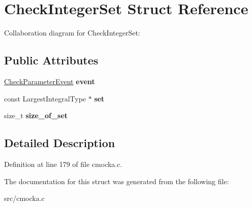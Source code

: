 \hypertarget{structCheckIntegerSet}{}\section{Check\+Integer\+Set Struct Reference}
\label{structCheckIntegerSet}


Collaboration diagram for Check\+Integer\+Set\+:
\subsection*{Public Attributes}
\begin{DoxyCompactItemize}
\item 
\mbox{\label{structCheckIntegerSet_a7153dfb1ec04c0fcacfeb2d60321d4fd}} 
\hyperlink{structCheckParameterEvent}{Check\+Parameter\+Event} {\bfseries event}
\item 
\mbox{\label{structCheckIntegerSet_a9bb5e12093c709bc42788033506c1c2a}} 
const Largest\+Integral\+Type $\ast$ {\bfseries set}
\item 
\mbox{\label{structCheckIntegerSet_a82dbcbeea43de48060c86d89c6ccc444}} 
size\+\_\+t {\bfseries size\+\_\+of\+\_\+set}
\end{DoxyCompactItemize}


\subsection{Detailed Description}


Definition at line 179 of file cmocka.\+c.



The documentation for this struct was generated from the following file\+:\begin{DoxyCompactItemize}
\item 
src/cmocka.\+c\end{DoxyCompactItemize}
